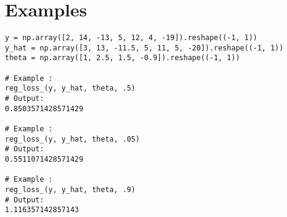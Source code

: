 
\section*{Examples}
\begin{verbatim}
y = np.array([2, 14, -13, 5, 12, 4, -19]).reshape((-1, 1))
y_hat = np.array([3, 13, -11.5, 5, 11, 5, -20]).reshape((-1, 1))
theta = np.array([1, 2.5, 1.5, -0.9]).reshape((-1, 1))

# Example :
reg_loss_(y, y_hat, theta, .5)
# Output:
0.8503571428571429

# Example :
reg_loss_(y, y_hat, theta, .05)
# Output:
0.5511071428571429

# Example :
reg_loss_(y, y_hat, theta, .9)
# Output:
1.116357142857143
\end{verbatim}